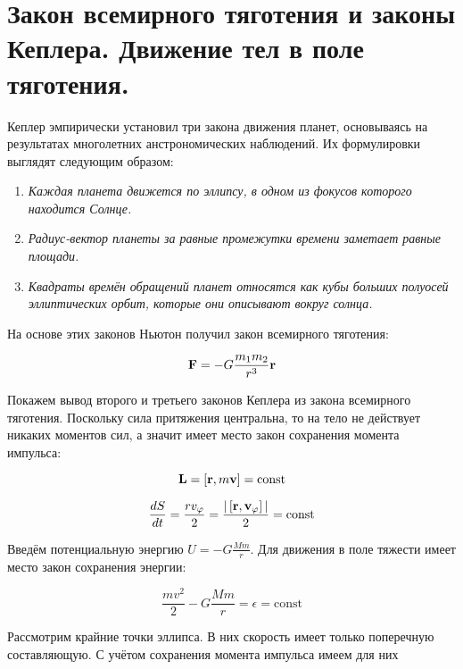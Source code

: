 \section{Закон всемирного тяготения и законы Кеплера. Движение тел в поле тяготения.}

Кеплер эмпирически установил три закона движения планет, основываясь на результатах многолетних анстрономических наблюдений. Их формулировки выглядят следующим образом:

\begin{enumerate}
    \item \textit{Каждая планета движется по эллипсу, в одном из фокусов которого находится Солнце.}
    \item \textit{Радиус-вектор планеты за равные промежутки времени заметает равные площади.}
    \item \textit{Квадраты времён обращений планет относятся как кубы больших полуосей эллиптических орбит, которые они описывают вокруг солнца.}
\end{enumerate}

На основе этих законов Ньютон получил закон всемирного тяготения:

\begin{equation} \label{eq:закон всемирного тяготения}
    \mathbf F = - G \frac{m_1 m_2}{r^3} \mathbf r
\end{equation}

Покажем вывод второго и третьего законов Кеплера из закона всемирного тяготения. Поскольку сила притяжения центральна, то на тело не действует никаких моментов сил, а значит имеет место закон сохранения момента импульса:

\begin{equation*}
    \mathbf L = \left[ \mathbf r, m \mathbf v \right] = \text{const}
\end{equation*}

\begin{equation*}
    \frac{dS}{dt} = \frac{r v_\varphi}{2} = \frac{|\left[ \mathbf r, \mathbf v_\varphi \right]|}{2} = \text{const}
\end{equation*}

Введём потенциальную энергию $U = - G \frac{M m}{r}$. Для движения в поле тяжести имеет место закон сохранения энергии:

\begin{equation*}
    \frac{m v^2}{2} - G \frac{M m}{r} = \epsilon = \text{const}
\end{equation*}

\noindent
Рассмотрим крайние точки эллипса. В них скорость имеет только поперечную составляющую. С учётом сохранения момента импульса имеем для них


